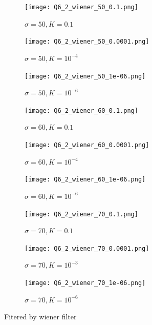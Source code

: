 \documentclass[
	12pt, %
]{style/fphw}
\begin{document}
\begin{figure}[H]
	\centering
		\begin{subfigure}[b]{.3\textwidth}
			\centering
			\texttt{[image: Q6\_2\_wiener\_50\_0.1.png]}
			\caption{$\sigma = 50, K = 0.1$}
			\label{Q6_2_wiener_50_0.1}
		\end{subfigure}
		\hfill
		\begin{subfigure}[b]{.3\textwidth}
			\centering
			\texttt{[image: Q6\_2\_wiener\_50\_0.0001.png]}
			\caption{$\sigma = 50, K = 10^{-4}$}
			\label{Q6_2_wiener_50_0.001}
		\end{subfigure}
		\hfill
		\begin{subfigure}[b]{.3\textwidth}
			\centering
			\texttt{[image: Q6\_2\_wiener\_50\_1e-06.png]}
			\caption{$\sigma = 50, K = 10^{-6}$}
			\label{Q6_2_wiener_50_1e-6}
		\end{subfigure}
	\vfill
		\begin{subfigure}[b]{.3\textwidth}
			\centering
			\texttt{[image: Q6\_2\_wiener\_60\_0.1.png]}
			\caption{$\sigma = 60, K = 0.1$}
			\label{Q6_2_wiener_60_0.1}
		\end{subfigure}
		\hfill
		\begin{subfigure}[b]{.3\textwidth}
			\centering
			\texttt{[image: Q6\_2\_wiener\_60\_0.0001.png]}
			\caption{$\sigma = 60, K = 10^{-4}$}
			\label{Q6_2_wiener_60_0.001}
		\end{subfigure}
		\hfill
		\begin{subfigure}[b]{.3\textwidth}
			\centering
			\texttt{[image: Q6\_2\_wiener\_60\_1e-06.png]}
			\caption{$\sigma = 60, K = 10^{-6}$}
			\label{Q6_2_wiener_60_1e-6}
		\end{subfigure}
	\vfill
		\begin{subfigure}[b]{.3\textwidth}
			\centering
			\texttt{[image: Q6\_2\_wiener\_70\_0.1.png]}
			\caption{$\sigma = 70, K = 0.1$}
			\label{Q6_2_wiener_70_0.1}
		\end{subfigure}
		\hfill
		\begin{subfigure}[b]{.3\textwidth}
			\centering
			\texttt{[image: Q6\_2\_wiener\_70\_0.0001.png]}
			\caption{$\sigma = 70, K = 10^{-3}$}
			\label{Q6_2_wiener_70_0.001}
		\end{subfigure}
		\hfill
		\begin{subfigure}[b]{.3\textwidth}
			\centering
			\texttt{[image: Q6\_2\_wiener\_70\_1e-06.png]}
			\caption{$\sigma = 70, K = 10^{-6}$}
			\label{Q6_2_wiener_70_1e-6}
		\end{subfigure}
	\caption{Fitered by wiener filter}
	\label{Fitered by wiener filter}	
\end{figure}
\end{document}
